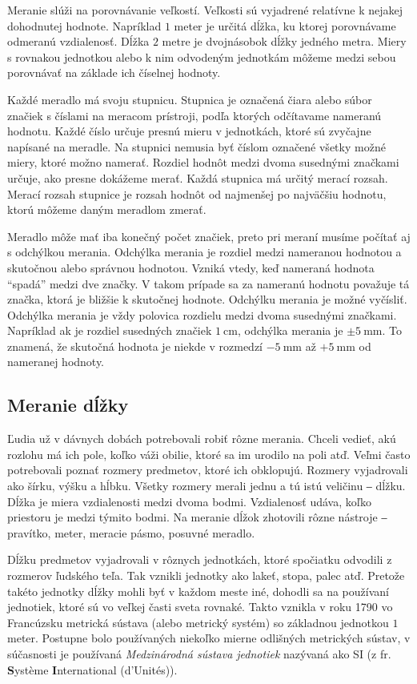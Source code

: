 \documentclass{article}
\begin{document}
Meranie slúži na porovnávanie veľkostí. Veľkosti sú vyjadrené relatívne k nejakej dohodnutej hodnote. Napríklad \(1\) meter je určitá dĺžka, ku ktorej porovnávame odmeranú vzdialenosť. Dĺžka \(2\) metre je dvojnásobok dĺžky jedného metra. Miery s rovnakou jednotkou alebo k nim odvodeným jednotkám môžeme medzi sebou porovnávať na základe ich číselnej hodnoty.

Každé meradlo má svoju stupnicu. Stupnica je označená čiara alebo súbor značiek s číslami na meracom prístroji, podľa ktorých odčítavame nameranú hodnotu. Každé číslo určuje presnú mieru v jednotkách, ktoré sú zvyčajne napísané na meradle. Na stupnici nemusia byť číslom označené všetky možné miery, ktoré možno namerať. Rozdiel hodnôt medzi dvoma susednými značkami určuje, ako presne dokážeme merať. Každá stupnica má určitý merací rozsah. Merací rozsah stupnice je rozsah hodnôt od najmenšej po najväčšiu hodnotu, ktorú môžeme daným meradlom zmerať.

Meradlo môže mať iba konečný počet značiek, preto pri meraní musíme počítať aj s odchýlkou merania. Odchýlka merania je rozdiel medzi nameranou hodnotou a skutočnou alebo správnou hodnotou. Vzniká vtedy, keď nameraná hodnota \enquote{spadá} medzi dve značky. V takom prípade sa za nameranú hodnotu považuje tá značka, ktorá je bližšie k skutočnej hodnote. Odchýlku merania je možné vyčísliť. Odchýlka merania je vždy polovica rozdielu medzi dvoma susednými značkami. Napríklad ak je rozdiel susedných značiek \(\SI{1}{\cm}\), odchýlka merania je \(\pm \SI{5}{\mm}\). To znamená, že skutočná hodnota je niekde v rozmedzí \(-\SI{5}{\mm}\) až \(+\SI{5}{\mm}\) od nameranej hodnoty.

\subsection{Meranie dĺžky}

Ľudia už v dávnych dobách potrebovali robiť rôzne merania. Chceli vedieť, akú rozlohu má ich pole, koľko váži obilie, ktoré sa im urodilo na poli atď. Veľmi často potrebovali poznať rozmery predmetov, ktoré ich obklopujú. Rozmery vyjadrovali ako šírku, výšku a hĺbku. Všetky rozmery merali jednu a tú istú veličinu ‒ dĺžku. Dĺžka je miera vzdialenosti medzi dvoma bodmi. Vzdialenosť udáva, koľko priestoru je medzi týmito bodmi. Na meranie dĺžok zhotovili rôzne nástroje ‒ pravítko, meter, meracie pásmo, posuvné meradlo.

Dĺžku predmetov vyjadrovali v rôznych jednotkách, ktoré spočiatku odvodili z rozmerov ľudského teľa. Tak vznikli jednotky ako lakeť, stopa, palec atď. Pretože takéto jednotky dĺžky mohli byť v každom meste iné, dohodli sa na používaní jednotiek, ktoré sú vo veľkej časti sveta rovnaké. Takto vznikla v roku 1790 vo Francúzsku metrická sústava (alebo metrický systém) so základnou jednotkou \(1\) meter. Postupne bolo používaných niekoľko mierne odlišných metrických sústav, v súčasnosti je používaná \emph{Medzinárodná sústava jednotiek} nazývaná ako SI (z fr. \textbf{S}ystème \textbf{I}nternational (d'Unités)).
\end{document}
